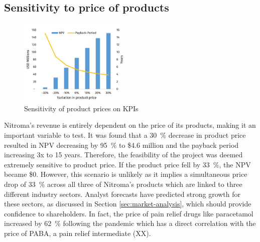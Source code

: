 \subsection{Sensitivity to price of products}
\begin{figure}
    \vspace{-1.1cm}
    \caption{Sensitivity of product prices on KPIs}
    \label{Sensitivity_ProductPrice}
    \includegraphics[width=0.47\textwidth]{chapters/6-economics/figures/Sensitivity_ProductPrice.jpg}
\end{figure}
Nitroma’s revenue is entirely dependent on the price of its products, making it an important variable to test. It was found that a \SI{30}{\percent} decrease in product price resulted in NPV decreasing by \SI{95}{\percent} to \$4.6 million and the payback period increasing 3x to 15 years. Therefore, the feasibility of the project was deemed extremely sensitive to product price.  If the product price fell by \SI{33}{\percent}, the NPV became \$0. However, this scenario is unlikely as it implies a simultaneous price drop of \SI{33}{\percent} across all three of Nitroma’s products which are linked to three different industry sectors. Analyst forecasts have predicted strong growth for these sectors, as discussed in Section \ref{sec:market-analysis}, which should provide confidence to shareholders. In fact, the price of pain relief drugs like paracetamol increased by \SI{62}{\percent} following the pandemic which has a direct correlation with the price of PABA, a pain relief intermediate (XX).

